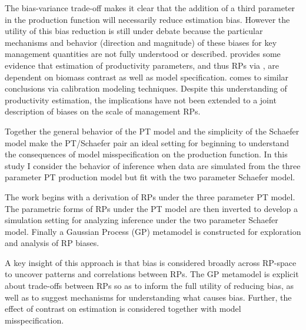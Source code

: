 \documentclass[12pt]{article}
\begin{document}
{%
The bias-variance trade-off  makes it 
clear that the addition of a third parameter in the production function will 
necessarily reduce estimation bias. However the utility of this bias reduction 
is still under debate because the particular mechanisms and behavior (direction and magnitude) %
of these biases for key management quantities %
are not fully understood or described.  provides some 
evidence that estimation of productivity parameters, and thus RPs via , 
are dependent on biomass contrast as well as model specification. %
 comes to similar conclusions %
via calibration modeling techniques. Despite this understanding of productivity estimation, 
the implications have not been extended to a joint description of biases on the scale of 
management RPs. %


Together the general behavior of the PT model and the %
simplicity of the Schaefer model make the PT/Schaefer pair an ideal setting for 
beginning to understand the consequences of model misspecification on the 
production function. In this study I consider the behavior of inference when 
data are simulated from the three parameter PT production model but fit with 
the two parameter Schaefer model. 

%
The work begins with a derivation of RPs under the three parameter PT model. 
The parametric forms of RPs under the PT model are then inverted to develop a 
simulation setting for analyzing inference under the two parameter Schaefer 
model. Finally a Gaussian Process (GP) metamodel  is constructed for exploration 
and analysis of RP biases. 

%
A key insight of this approach is that bias is considered broadly across RP-space to 
uncover patterns and correlations between RPs. %
The GP metamodel is explicit about trade-offs between RPs %
so as to inform the full utility of reducing bias, as well as to suggest mechanisms for 
understanding what causes bias. Further, the effect of contrast on estimation 
is considered together with model misspecification. %

}
\end{document}
